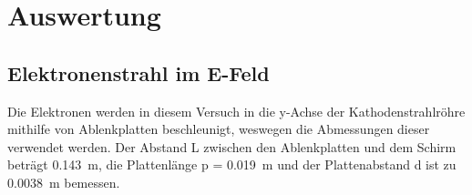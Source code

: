 
\section{Auswertung}
%
\subsection{Elektronenstrahl im E-Feld}
%
Die Elektronen werden in diesem Versuch in die y-Achse der Kathodenstrahlröhre mithilfe von Ablenkplatten beschleunigt, weswegen die Abmessungen dieser verwendet werden. Der Abstand L zwischen den Ablenkplatten und dem Schirm beträgt \SI{0.143}{\metre}, die Plattenlänge p = \SI{0.019}{\metre} und der Plattenabstand d ist zu \SI{0.0038}{\metre} bemessen.
%
